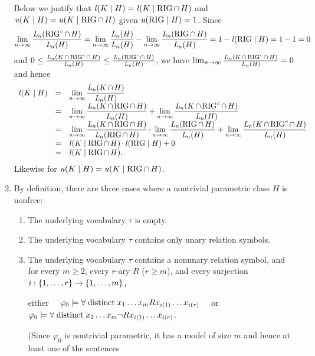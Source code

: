 \begin{enumerate}[1.]
Below we justify that $\lprob(K \wrt H) = \lprob(K \wrt \rigid \intsc H)$ and $\uprob(K \wrt H) = \uprob(K \wrt \rigid \intsc H)$ given $\uprob(\rigid \wrt H) = 1$. Since
\[
\lim_{n \to \infty} \frac{\lclass{n}(\cmpl{\rigid} \intsc H)}{\lclass{n}(H)} = \lim_{n \to \infty} \frac{\lclass{n}(H)}{\lclass{n}(H)} - \lim_{n \to \infty} \frac{\lclass{n}(\rigid \intsc H)}{\lclass{n}(H)} = 1 - \lprob(\rigid \wrt H) = 1 - 1 = 0
\]
and $0 \leq \frac{\mathit{L}_{n}(K \mathop{\cap} \mathrm{RIG}^\mathit{c} \mathop{\cap} H)}{\mathit{L}_{n}(H)} \leq \frac{\mathit{L}_{n}(\mathrm{RIG}^\mathit{c} \mathop{\cap} H)}{\mathit{L}_{n}(H)}$, we have $\lim_{n \to \infty} \frac{\mathit{L}_{n}(K \mathop{\cap} \mathrm{RIG}^\mathit{c} \mathop{\cap} H)}{\mathit{L}_{n}(H)} = 0$ and hence
\[
\begin{array}{lll}
\lprob(K \wrt H) & = & \displaystyle \lim_{n \to \infty} \frac{\lclass{n}(K \intsc H)}{\lclass{n}(H)} \cr
\ & = & \displaystyle \lim_{n \to \infty} \frac{\lclass{n}(K \intsc \rigid \intsc H)}{\lclass{n}(H)} + \lim_{n \to \infty} \frac{\lclass{n}(K \intsc \cmpl{\rigid} \intsc H)}{\lclass{n}(H)} \cr
\ & = & \displaystyle \lim_{n \to \infty} \frac{\lclass{n}(K \intsc \rigid \intsc H)}{\lclass{n}(\rigid \intsc H)} \mul \lim_{n \to \infty} \frac{\lclass{n}(\rigid \intsc H)}{\lclass{n}(H)} + \lim_{n \to \infty} \frac{\lclass{n}(K \intsc \cmpl{\rigid} \intsc H)}{\lclass{n}(H)} \cr
\ & = & \lprob(K \wrt \rigid \intsc H) \mul \lprob(\rigid \wrt H) + 0 \cr
\ & = & \lprob(K \wrt \rigid \intsc H).
\end{array}
\]
Likewise for $\uprob(K \wrt H) = \uprob(K \wrt \rigid \intsc H)$.
%
\item {} By definition, there are three cases where a nontrivial parametric class $H$ is nonfree:
\begin{enumerate}[(1)]
\item The underlying vocabulary $\tau$ is empty.
\item The underlying vocabulary $\tau$ contains only unary relation symbols.
\item The underlying vocabulary $\tau$ contains a nonunary relation symbol, and for every $m \geq 2$, every $r$-ary $R$ ($r \geq m$), and every surjection $i : {\{1, \ldots, r\}} \to {\{1, \ldots, m\}}$,
\begin{center}
either \ \ $\varphi_0 \models \forall \mathrel{\mathrm{distinct}} x_1 \ldots x_m Rx_{i(1)} \ldots x_{i(r)}$ \ \ or \ \ $\varphi_0 \models \forall \mathrel{\mathrm{distinct}} x_1 \ldots x_m \neg Rx_{i(1)} \ldots x_{i(r)}$.
\end{center}
(Since $\varphi_0$ is nontrivial parametric, it has a model of size $m$ and hence at least one of the sentences

\end{enumerate}
\end{enumerate}
